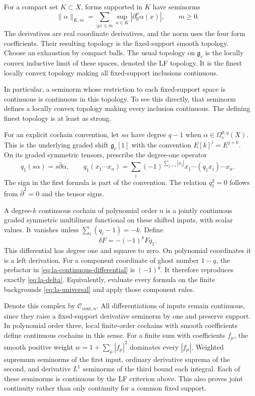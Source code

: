 For a compact set $K\subset X$, forms supported in $K$ have
seminorms
\[
 \|\alpha\|_{K,m}
 =\sum_{|\mu|\leq m}\sup_{x\in K}
                      |\partial_{\mathbb R}^{\mu}\alpha(x)|,
 \qquad m\geq0.
\]
The derivatives are real coordinate derivatives, and the norm
uses the four form coefficients. Their resulting topology is
the fixed-support smooth topology. Choose an exhaustion by
compact balls. The usual topology on $\mathfrak g_c$ is the
locally convex inductive limit of these spaces, denoted the
LF topology. It is the finest locally convex topology making
all fixed-support inclusions continuous.

In particular, a seminorm whose restriction to each
fixed-support space is continuous is continuous in this
topology. To see this directly, that seminorm defines a
locally convex topology making every inclusion continuous.
The defining finest topology is at least as strong.

For an explicit cochain convention, let $s\alpha$ have degree
$q-1$ when $\alpha\in\Omega_c^{0,q}(X)$.
This is the underlying graded shift $\mathfrak g_c[1]$ with
the convention $E[k]^j=E^{j+k}$. On its graded symmetric
tensors, prescribe the degree-one operator
\begin{equation}\label{eq:la-cochain-input-differential}
 q_1(s\alpha)=s\bar\partial\alpha,
 \qquad
 q_1(x_1\cdots x_n)
 =\sum_i(-1)^{\sum_{j<i}|x_j|}
       x_1\cdots(q_1x_i)\cdots x_n.
\end{equation}
The sign in the first formula is part of the convention.
The relation $q_1^2=0$ follows from $\bar\partial^2=0$ and
the tensor signs.

A degree-$k$ continuous cochain of polynomial order $n$ is a
jointly continuous graded symmetric multilinear functional
on these shifted inputs, with scalar values. It vanishes
unless $\sum_i(q_i-1)=-k$. Define
\begin{equation}\label{eq:la-continuous-differential}
 \delta F=-(-1)^kFq_1.
\end{equation}
This differential has degree one and squares to zero.
On polynomial coordinates it is a left derivation. For a
component coordinate of ghost number $1-q$, the prefactor in
\eqref{eq:la-continuous-differential} is $(-1)^q$.
It therefore reproduces exactly \eqref{eq:la-delta}.
Equivalently, evaluate every formula on the finite backgrounds
\eqref{eq:la-universal} and apply those component rules.

Denote this complex by $\mathcal C_{\mathrm{cont},n}$.
All differentiations of inputs remain continuous, since they
raise a fixed-support derivative seminorm by one and preserve
support. In polynomial order three, local finite-order
cochains with smooth coefficients define continuous cochains
in this sense. For a finite sum with coefficients $f_\mu$,
the smooth positive weight $w=1+\sum_\mu|f_\mu|^2$
dominates every $|f_\mu|$. Weighted supremum seminorms of
the first input, ordinary derivative suprema of the second,
and derivative $L^1$ seminorms of the third bound each integral.
Each of these seminorms is continuous by the LF criterion
above. This also proves joint continuity rather than only
continuity for a common fixed support.

